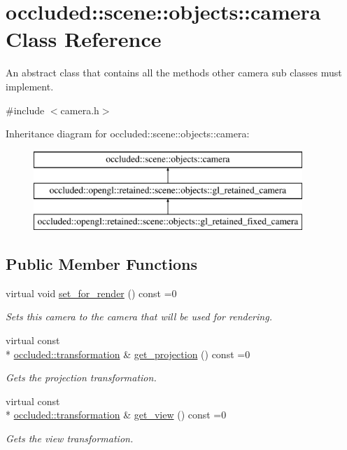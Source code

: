 \hypertarget{classoccluded_1_1scene_1_1objects_1_1camera}{\section{occluded\+:\+:scene\+:\+:objects\+:\+:camera Class Reference}
\label{classoccluded_1_1scene_1_1objects_1_1camera}
}


An abstract class that contains all the methods other camera sub classes must implement.  




{\ttfamily \#include $<$camera.\+h$>$}

Inheritance diagram for occluded\+:\+:scene\+:\+:objects\+:\+:camera\+:\begin{figure}[H]
\begin{center}
\leavevmode
\includegraphics[height=3.000000cm]{classoccluded_1_1scene_1_1objects_1_1camera}
\end{center}
\end{figure}
\subsection*{Public Member Functions}
\begin{DoxyCompactItemize}
\item 
virtual void \hyperlink{classoccluded_1_1scene_1_1objects_1_1camera_a4e62fa6846f1009409a7ed87fe03f8ca}{set\+\_\+for\+\_\+render} () const =0
\begin{DoxyCompactList}\small\item\em Sets this camera to the camera that will be used for rendering. \end{DoxyCompactList}\item 
virtual const \\*
\hyperlink{classoccluded_1_1scene_1_1nodes_1_1transformation}{occluded\+::transformation} \& \hyperlink{classoccluded_1_1scene_1_1objects_1_1camera_ae045f6f1549e58c3211e75a708f8f490}{get\+\_\+projection} () const =0
\begin{DoxyCompactList}\small\item\em Gets the projection transformation. \end{DoxyCompactList}\item 
virtual const \\*
\hyperlink{classoccluded_1_1scene_1_1nodes_1_1transformation}{occluded\+::transformation} \& \hyperlink{classoccluded_1_1scene_1_1objects_1_1camera_aa4168c8ffacdf6a3eb52b528d4780d4e}{get\+\_\+view} () const =0
\begin{DoxyCompactList}\small\item\em Gets the view transformation. \end{DoxyCompactList}\end{DoxyCompactItemize}


